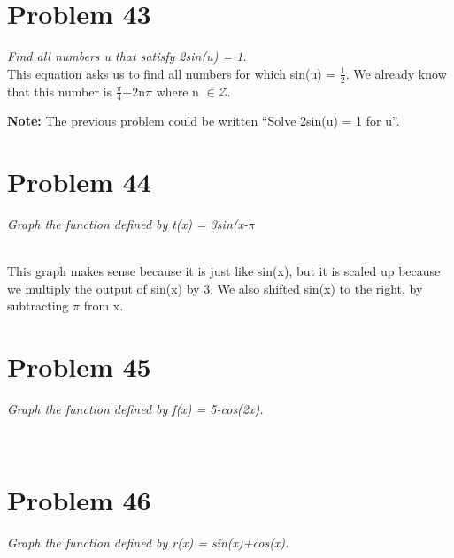 \documentclass[11pt]{article} %
\begin{document}
{\section{Problem 43}
\textit{Find all numbers u that satisfy 2sin(u) = 1.}
\\
This equation asks us to find all numbers for which sin(u) = $\frac{1}{2}$. We already know that this number is $\frac{\pi}{4}$+2n$\pi$ where n $\in \mathcal{Z}$.

\textbf{Note:} The previous problem could be written “Solve 2sin(u) = 1 for u”.
\section{Problem 44}
\textit{ Graph the function defined by t(x) = 3sin(x-$\pi$}
\\ \\
This graph makes sense because it is just like sin(x), but it is scaled up because we multiply the output of sin(x) by 3. We also shifted sin(x) to the right, by subtracting $\pi$ from x. 

\section{Problem 45}
\textit{Graph the function defined by f(x) = 5-cos(2x).}
\\ \\

\section{Problem 46}
\textit{Graph the function defined by r(x) = sin(x)+cos(x).}
\\ \\

}
\end{document}
